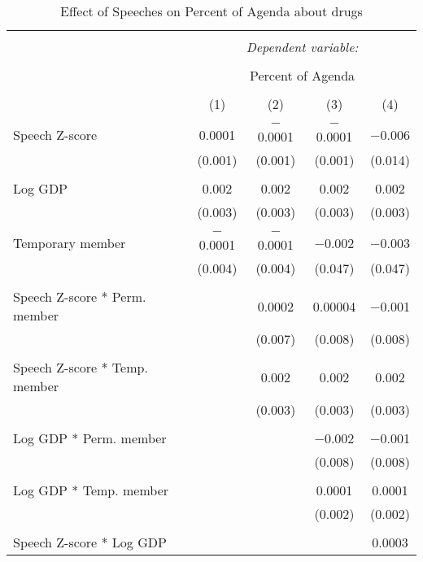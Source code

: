 
\begin{table}[!htbp] \centering 
  \caption{Effect of Speeches on Percent of Agenda about drugs} 
  \label{} 
\begin{tabular}{@{\extracolsep{5pt}}lcccc} 
\\[-1.8ex]\hline 
\hline \\[-1.8ex] 
 & \multicolumn{4}{c}{\textit{Dependent variable:}} \\ 
\cline{2-5} 
\\[-1.8ex] & \multicolumn{4}{c}{Percent of Agenda} \\ 
\\[-1.8ex] & (1) & (2) & (3) & (4)\\ 
\hline \\[-1.8ex] 
 Speech Z-score & 0.0001 & $-$0.0001 & $-$0.0001 & $-$0.006 \\ 
  & (0.001) & (0.001) & (0.001) & (0.014) \\ 
  & & & & \\ 
 Log GDP & 0.002 & 0.002 & 0.002 & 0.002 \\ 
  & (0.003) & (0.003) & (0.003) & (0.003) \\ 
  & & & & \\ 
 Temporary member & $-$0.0001 & $-$0.0001 & $-$0.002 & $-$0.003 \\ 
  & (0.004) & (0.004) & (0.047) & (0.047) \\ 
  & & & & \\ 
 Speech Z-score * Perm. member &  & 0.0002 & 0.00004 & $-$0.001 \\ 
  &  & (0.007) & (0.008) & (0.008) \\ 
  & & & & \\ 
 Speech Z-score * Temp. member &  & 0.002 & 0.002 & 0.002 \\ 
  &  & (0.003) & (0.003) & (0.003) \\ 
  & & & & \\ 
 Log GDP * Perm. member &  &  & $-$0.002 & $-$0.001 \\ 
  &  &  & (0.008) & (0.008) \\ 
  & & & & \\ 
 Log GDP * Temp. member &  &  & 0.0001 & 0.0001 \\ 
  &  &  & (0.002) & (0.002) \\ 
  & & & & \\ 
 Speech Z-score * Log GDP &  &  &  & 0.0003 \\ 

\end{tabular}
\end{table}
